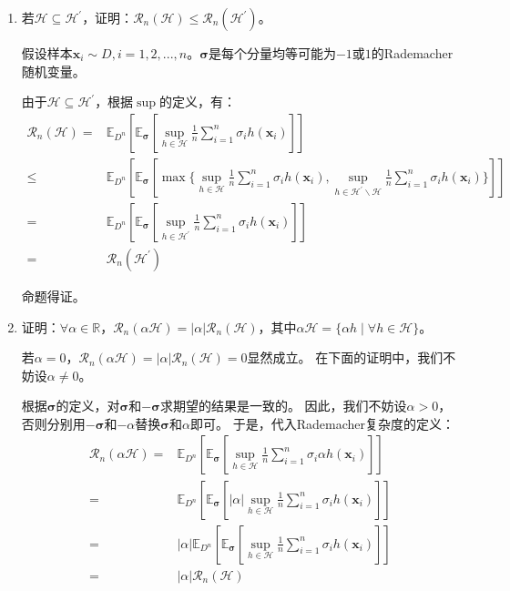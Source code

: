 \documentclass[12pt, a4paper]{article}
\newcommand{\expect}{{\mathbb{E}}}
\newcommand{\HH}{{\mathcal{H}}}
\newcommand{\RR}{{\mathcal{R}}}
\begin{document}
    \begin{enumerate}

    \item 若$\HH \subseteq \HH^\prime$，证明：$\RR_n(\HH) \le \RR_n(\HH^\prime)$。

        假设样本$\bm{x}_i \sim D, i = 1, 2, ..., n$。$\bm{\sigma}$是每个分量均等可能为$-1$或$1$的Rademacher随机变量。

        由于$\HH \subseteq \HH^\prime$，根据$\sup$的定义，有：
        \begin{align*}
        \RR_n(\HH)
        =& \expect_{D^n} [\expect_{\bm{\sigma}} [\sup_{h \in \HH} \frac{1}{n} \sum_{i = 1}^{n} \sigma_i h(\bm{x}_i)]] \\
        \le& \expect_{D^n} [\expect_{\bm{\sigma}} [\max\{\sup_{h \in \HH} \frac{1}{n} \sum_{i = 1}^{n} \sigma_i h(\bm{x}_i), \sup_{h \in \HH^\prime \backslash \HH} \frac{1}{n} \sum_{i = 1}^{n} \sigma_i h(\bm{x}_i)\}]] \\
        =& \expect_{D^n} [\expect_{\bm{\sigma}} [\sup_{h \in \HH^\prime} \frac{1}{n} \sum_{i = 1}^{n} \sigma_i h(\bm{x}_i)]] \\
        =& \RR_n(\HH^\prime)
        \end{align*}

        命题得证。

    \item 证明：$\forall \alpha \in \mathbb{R}$，$\RR_n(\alpha \HH) = \vert \alpha \vert \RR_n(\HH)$，其中$\alpha \HH = \{\alpha h \mid \forall h \in \HH\}$。

        若$\alpha = 0$，$\RR_n(\alpha \HH) = \vert \alpha \vert \RR_n(\HH) = 0$显然成立。
        在下面的证明中，我们不妨设$\alpha \ne 0$。

        根据$\bm{\sigma}$的定义，对$\bm{\sigma}$和$- \bm{\sigma}$求期望的结果是一致的。
        因此，我们不妨设$\alpha > 0$，否则分别用$- \bm{\sigma}$和$- \alpha$替换$\bm{\sigma}$和$\alpha$即可。
        于是，代入Rademacher复杂度的定义：
        \begin{align*}
        \RR_n(\alpha \HH)
        =& \expect_{D^n} [\expect_{\bm{\sigma}} [\sup_{h \in \HH} \frac{1}{n} \sum_{i = 1}^{n} \sigma_i \alpha h(\bm{x}_i)]] \\
        =& \expect_{D^n} [\expect_{\bm{\sigma}} [ \vert \alpha \vert \sup_{h \in \HH} \frac{1}{n} \sum_{i = 1}^{n} \sigma_i h(\bm{x}_i)]] \\
        =& \vert \alpha \vert \expect_{D^n} [\expect_{\bm{\sigma}} [\sup_{h \in \HH} \frac{1}{n} \sum_{i = 1}^{n} \sigma_i h(\bm{x}_i)]] \\
        =& \vert \alpha \vert \RR_n(\HH)
        \end{align*}


\end{enumerate}
\end{document}
